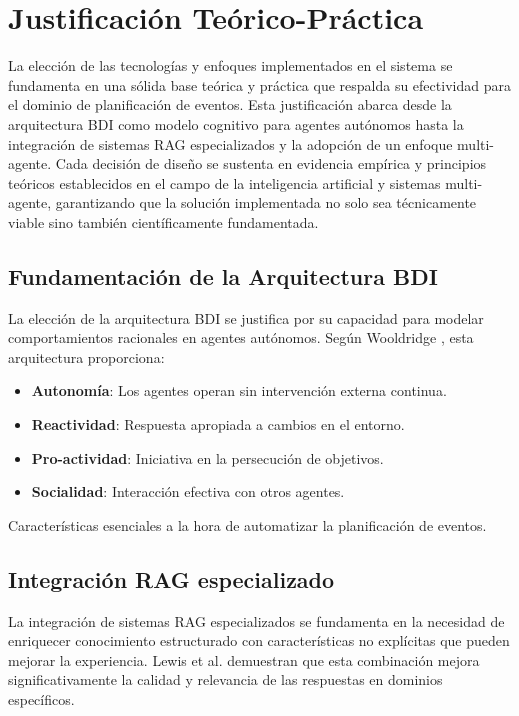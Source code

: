 \documentclass[runningheads,a4paper]{llncs}
\begin{document}
\section{Justificación Teórico-Práctica}

La elección de las tecnologías y enfoques implementados en el sistema se fundamenta en una sólida base teórica y práctica 
que respalda su efectividad para el dominio de planificación de eventos. Esta justificación abarca desde la arquitectura 
BDI como modelo cognitivo para agentes autónomos hasta la integración de sistemas RAG especializados y la adopción de un 
enfoque multi-agente. Cada decisión de diseño se sustenta en evidencia empírica y principios teóricos establecidos en el 
campo de la inteligencia artificial y sistemas multi-agente, garantizando que la solución implementada no solo sea técnicamente 
viable sino también científicamente fundamentada.

\subsection{Fundamentación de la Arquitectura BDI}

La elección de la arquitectura BDI se justifica por su capacidad para modelar comportamientos racionales en agentes 
autónomos. Según Wooldridge \cite{wooldridge2009introduction}, esta arquitectura proporciona:

\begin{itemize}
    \item \textbf{Autonomía}: Los agentes operan sin intervención externa continua.
    \item \textbf{Reactividad}: Respuesta apropiada a cambios en el entorno.
    \item \textbf{Pro-actividad}: Iniciativa en la persecución de objetivos.
    \item \textbf{Socialidad}: Interacción efectiva con otros agentes.
\end{itemize}

Características esenciales a la hora de automatizar la planificación de eventos.

\subsection{Integración RAG especializado}

La integración de sistemas RAG especializados se fundamenta en la necesidad de enriquecer conocimiento estructurado con 
características no explícitas que pueden mejorar la experiencia. Lewis et al. demuestran que esta combinación mejora 
significativamente la calidad y relevancia de las respuestas en dominios específicos.
\end{document}

